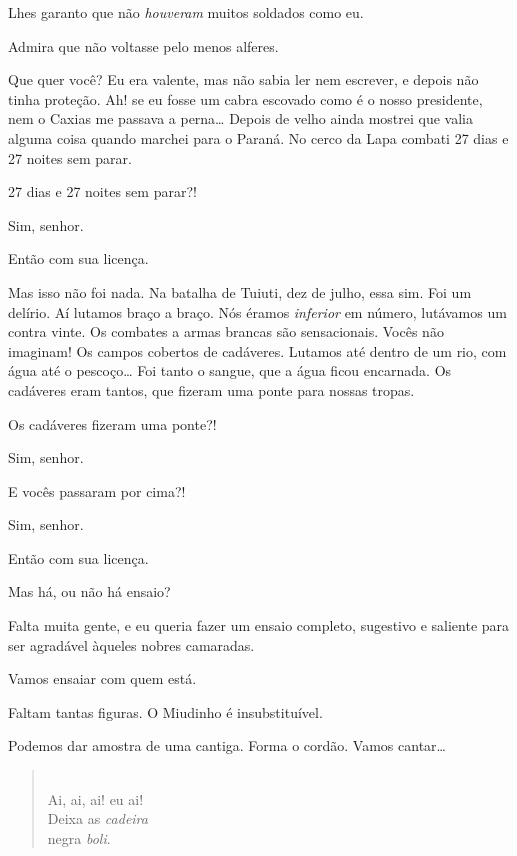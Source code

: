  Lhes garanto que não \textit{houveram} muitos soldados como
eu.

 Admira que não voltasse pelo menos alferes.

 Que quer você? Eu era valente, mas não
sabia ler nem escrever, e depois não tinha proteção. Ah! se eu fosse um cabra
escovado como é o nosso presidente, nem o Caxias me passava a perna\ldots{} Depois de
velho ainda mostrei que valia alguma coisa quando marchei para o Paraná. No
cerco da Lapa combati 27 dias e 27 noites sem parar.

 27 dias e 27 noites sem parar?!

 Sim, senhor.

 Então com sua licença.  

 Mas isso não foi nada. Na batalha de Tuiuti, dez de julho,
essa sim. Foi um delírio. Aí lutamos braço a braço. Nós éramos \textit{inferior}
em número, lutávamos um contra vinte. Os combates a armas brancas são
sensacionais. Vocês não imaginam! Os campos cobertos de cadáveres. Lutamos até
dentro de um rio, com água até o pescoço\ldots{} Foi tanto o sangue, que a água ficou
encarnada. Os cadáveres eram tantos, que fizeram uma ponte para nossas tropas.

 Os cadáveres fizeram uma ponte?!

 Sim, senhor.

 E vocês passaram por cima?!

 Sim, senhor.

 Então com sua licença.  

 Mas há, ou não há ensaio?

 Falta muita gente, e eu queria fazer um ensaio completo,
sugestivo e saliente para ser agradável àqueles nobres camaradas.

 Vamos ensaiar com quem está.

 Faltam tantas figuras. O Miudinho é insubstituível.

 Podemos dar amostra de uma cantiga. Forma o cordão.
Vamos cantar\ldots

\begin{verse}
 \\
Ai, ai, ai! eu ai!\\
Deixa as \textit{cadeira}\\
negra \textit{boli}.
\end{verse}

